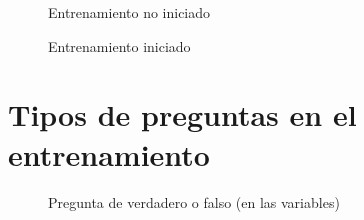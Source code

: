 {\begin{figure}[H]
\centering
 \caption{Entrenamiento no iniciado}
 \label{fig:eniniciado} 
\end{figure}

\begin{figure}[H]
\centering
 \caption{Entrenamiento iniciado}
 \label{fig:einiciado} 
\end{figure}

\section{Tipos de preguntas en el entrenamiento}

\begin{figure}[H]
\centering
 \caption{Pregunta de verdadero o falso (en las variables)}
 \label{fig:pregvar} 
\end{figure}

}
